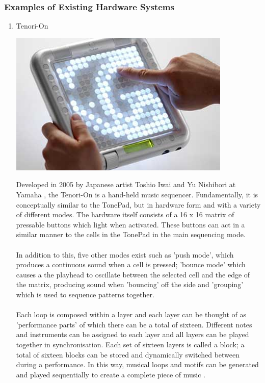 \documentclass[10pt,a4paper]{article}
\begin{document}
\subsubsection{Examples of Existing Hardware Systems}
\begin{enumerate}
\item Tenori-On
\begin{center}
\includegraphics[scale=0.5]{3.jpg}\
\end{center}
Developed in 2005 by Japanese artist Toshio Iwai and Yu Nishibori at Yamaha \cite{tenorionwiki}, the Tenori-On is a hand-held music sequencer. Fundamentally, it is conceptually similar to the TonePad, but in hardware form and with a variety of different modes. The hardware itself consists of a 16 x 16 matrix of pressable buttons which light when activated. These buttons can act in a similar manner to the cells in the TonePad in the main sequencing mode.\\
\\
In addition to this, five other modes exist such as 'push mode', which produces a continuous sound when a cell is pressed; 'bounce mode' which causes a the playhead to oscillate between the selected cell and the edge of the matrix, producing sound when 'bouncing' off the side and 'grouping' which is used to sequence patterns together.\\
\\
Each loop is composed within a layer and each layer can be thought of as 'performance parts' of which there can be a total of sixteen. Different notes and instruments can be assigned to each layer and all layers can be played together in synchronisation. Each set of sixteen layers is called a block; a total of sixteen blocks can be stored and dynamically switched between during a performance. In this way, musical loops and motifs can be generated and played sequentially to create a complete piece of music \cite{tenorionyamaha}.


\end{enumerate}
\end{document}
